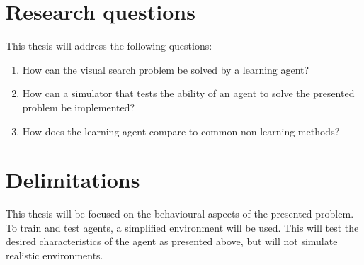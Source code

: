 \section{Research questions}
\label{sec:research-questions}

This thesis will address the following questions:

\begin{enumerate}
  \item How can the visual search problem be solved by a learning agent?
  \item How can a simulator that tests the ability of an agent to solve the presented problem be implemented?
  \item How does the learning agent compare to common non-learning methods?
\end{enumerate}

\section{Delimitations}
\label{sec:delimitations}

This thesis will be focused on the behavioural aspects of the presented problem. To train and test agents, a simplified environment will be used. This will test the desired characteristics of the agent as presented above, but will not simulate realistic environments.